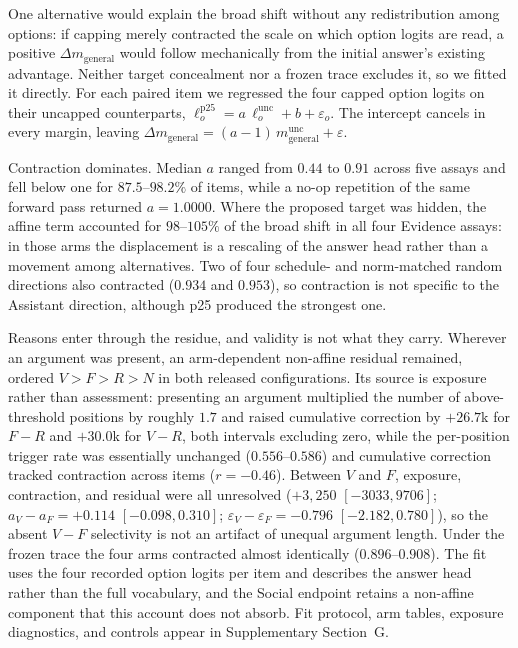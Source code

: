 \documentclass[letterpaper]{article} %
\begin{document}
One alternative would explain the broad shift without any redistribution among options: if capping merely contracted the scale on which option logits are read, a positive $\Delta m_{\mathrm{general}}$ would follow mechanically from the initial answer's existing advantage. Neither target concealment nor a frozen trace excludes it, so we fitted it directly. For each paired item we regressed the four capped option logits on their uncapped counterparts, $\ell^{\mathrm{p25}}_{o}=a\,\ell^{\mathrm{unc}}_{o}+b+\varepsilon_{o}$. The intercept cancels in every margin, leaving $\Delta m_{\mathrm{general}}=(a-1)\,m^{\mathrm{unc}}_{\mathrm{general}}+\varepsilon$.

Contraction dominates. Median $a$ ranged from $0.44$ to $0.91$ across five assays and fell below one for $87.5$--$98.2\%$ of items, while a no-op repetition of the same forward pass returned $a=1.0000$. Where the proposed target was hidden, the affine term accounted for $98$--$105\%$ of the broad shift in all four Evidence assays: in those arms the displacement is a rescaling of the answer head rather than a movement among alternatives. Two of four schedule- and norm-matched random directions also contracted ($0.934$ and $0.953$), so contraction is not specific to the Assistant direction, although p25 produced the strongest one.

Reasons enter through the residue, and validity is not what they carry. Wherever an argument was present, an arm-dependent non-affine residual remained, ordered $V>F>R>N$ in both released configurations. Its source is exposure rather than assessment: presenting an argument multiplied the number of above-threshold positions by roughly $1.7$ and raised cumulative correction by $+26.7$k for $F-R$ and $+30.0$k for $V-R$, both intervals excluding zero, while the per-position trigger rate was essentially unchanged ($0.556$--$0.586$) and cumulative correction tracked contraction across items ($r=-0.46$). Between $V$ and $F$, exposure, contraction, and residual were all unresolved ($+3{,}250$ $[-3033,9706]$; $a_{V}-a_{F}=+0.114$ $[-0.098,0.310]$; $\varepsilon_{V}-\varepsilon_{F}=-0.796$ $[-2.182,0.780]$), so the absent $V-F$ selectivity is not an artifact of unequal argument length. Under the frozen trace the four arms contracted almost identically ($0.896$--$0.908$). The fit uses the four recorded option logits per item and describes the answer head rather than the full vocabulary, and the Social endpoint retains a non-affine component that this account does not absorb. Fit protocol, arm tables, exposure diagnostics, and controls appear in Supplementary Section~G.
\end{document}
